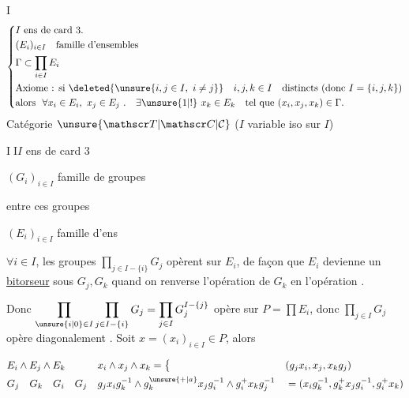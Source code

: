 \textcircled{I}
\[
\left\{\begin{aligned}
&I\ \text{ens de card }3.\\
&(E_i)_{i\in I}\quad\text{famille d'ensembles}\\
&\Gamma\subset\prod_{i\in I}E_i\\
&\text{Axiome : si }\deleted{\unsure{i,j\in I,\ i\ne j}}\quad i,j,k\in I\quad\text{distincts (donc }I=\{i,j,k\}\text{)}\\
&\text{alors }\ \forall x_i\in E_i,\ x_j\in E_j\ .\quad\exists\unsure{1|!}\ x_k\in E_k\quad\text{tel que }(x_i,x_j,x_k)\in\Gamma .
\end{aligned}\right.
\]
Catégorie $\unsure{\mathscr T|\mathscr C|\mathcal C}$ ($I$ variable\unsure{,|;}  iso sur $I$)

\textcircled{II}\quad $I$ ens de card $3$

$(G_i)_{i\in I}$ famille de groupes

 entre ces groupes

$(E_i)_{i\in I}$ famille d'ens

$\forall i\in I$, les groupes $\prod_{j\in I-\{i\}}G_j$ opèrent sur $E_i$, de façon que  $E_i$ devienne un \uline{bitorseur} sous $G_j,G_k$ quand on renverse l'opération de $G_k$ en l'opération .

Donc $\displaystyle\prod_{\unsure{i|0}\in I}\prod_{j\in I-\{i\}}G_j=\prod_{j\in I}G_j^{I-\{j\}}$ opère sur $P=\prod E_i$, donc $\prod_{j\in I}G_j$ opère diagonalement . Soit $x=(x_i)_{i\in I}\in P$, alors

\[
\begin{aligned}
&E_i\wedge E_j\wedge E_k &&x_i\wedge x_j\wedge x_k= \big\{ &&(g_j x_i,x_j,x_k g_j)\\
&G_j\quad G_k\quad G_i\quad G_j &&
g_j x_i g_k^{-1}\wedge g_k^{\unsure{+|a}}x_jg_i^{-1}\wedge g_i^{+}x_k g_j^{-1}
&&=(x_i g_k^{-1},g_k^{+}x_jg_i^{-1},g_i^{+}x_k)
\end{aligned}
\]

